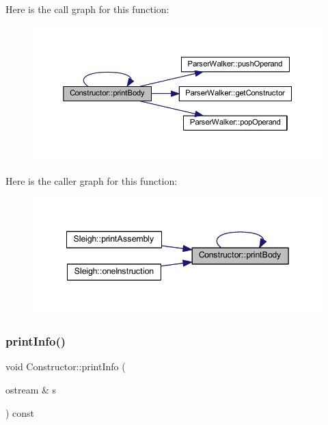 Here is the call graph for this function\+:
\nopagebreak
\begin{figure}[H]
\begin{center}
\leavevmode
\includegraphics[width=350pt]{class_constructor_a848fb41c8ca95cc49609e017f8934b59_cgraph}
\end{center}
\end{figure}
Here is the caller graph for this function\+:
\nopagebreak
\begin{figure}[H]
\begin{center}
\leavevmode
\includegraphics[width=342pt]{class_constructor_a848fb41c8ca95cc49609e017f8934b59_icgraph}
\end{center}
\end{figure}
\mbox{\label{class_constructor_a2a0182b33c360d0d987a2ce62a5c8abe}} 
\subsubsection{\texorpdfstring{printInfo()}{printInfo()}}
{\footnotesize\ttfamily void Constructor\+::print\+Info (\begin{DoxyParamCaption}\item[{ostream \&}]{s }\end{DoxyParamCaption}) const}



